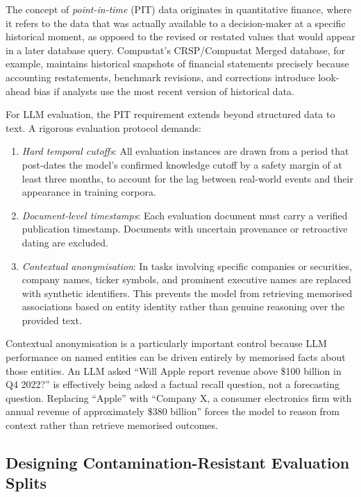 The concept of \emph{point-in-time} (PIT) data originates in quantitative finance,
where it refers to the data that was actually available to a decision-maker at a
specific historical moment, as opposed to the revised or restated values that would
appear in a later database query. Compustat's CRSP/Compustat Merged database, for
example, maintains historical snapshots of financial statements precisely because
accounting restatements, benchmark revisions, and corrections introduce look-ahead
bias if analysts use the most recent version of historical data.

For LLM evaluation, the PIT requirement extends beyond structured data to text. A
rigorous evaluation protocol demands:

\begin{enumerate}
  \item \emph{Hard temporal cutoffs}: All evaluation instances are drawn from a period
        that post-dates the model's confirmed knowledge cutoff by a safety margin of at
        least three months, to account for the lag between real-world events and their
        appearance in training corpora.
  \item \emph{Document-level timestamps}: Each evaluation document must carry a verified
        publication timestamp. Documents with uncertain provenance or retroactive dating
        are excluded.
  \item \emph{Contextual anonymisation}: In tasks involving specific companies or
        securities, company names, ticker symbols, and prominent executive names are
        replaced with synthetic identifiers. This prevents the model from retrieving
        memorised associations based on entity identity rather than genuine reasoning
        over the provided text.
\end{enumerate}

Contextual anonymisation is a particularly important control because LLM performance on
named entities can be driven entirely by memorised facts about those entities. An LLM
asked ``Will Apple report revenue above \$100 billion in Q4 2022?'' is effectively
being asked a factual recall question, not a forecasting question. Replacing ``Apple''
with ``Company X, a consumer electronics firm with annual revenue of approximately \$380
billion'' forces the model to reason from context rather than retrieve memorised outcomes.

\subsection{Designing Contamination-Resistant Evaluation Splits}
\label{sec:ch13-contamination-resistant-splits}

